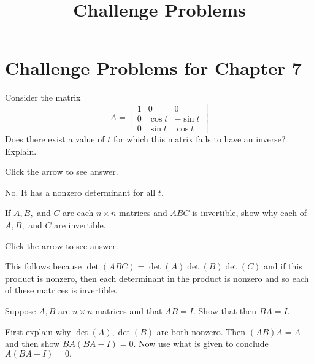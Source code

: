 \documentclass{ximera}
\title{Challenge Problems} \license{CC BY-NC-SA 4.0}
\begin{document}
\begin{abstract}
\end{abstract}
\maketitle

\section*{Challenge Problems for Chapter 7}

\begin{problem}\label{prb:7.32} Consider the matrix
\begin{equation*}
A =
\left[
\begin{array}{ccc}
1 & 0 & 0 \\
0 & \cos t & -\sin t \\
0 & \sin t & \cos t
\end{array}
\right]
\end{equation*}
Does there exist a value of $t$ for which this matrix fails to have an
inverse? Explain.

Click the arrow to see answer.
\begin{expandable}
 No. It has a nonzero determinant for all $t$.
\end{expandable}
\end{problem}

\begin{problem}\label{prb:7.41} If $A,B,$ and $C$ are each $n\times n$ matrices and $ABC$ is
invertible, show why each of $A,B,$ and $C$ are invertible.

Click the arrow to see answer.

\begin{expandable}
This follows
because $\det \left( ABC\right) =\det \left( A\right) \det \left( B\right)
\det \left( C\right) $ and if this product is nonzero, then each determinant
in the product is nonzero and so each of these matrices is invertible.
\end{expandable}
\end{problem}

\begin{problem}\label{prb:7.37} Suppose $A,B$ are $n\times n$ matrices and that $AB=I.$ Show that then
$BA=I.$ 
\begin{hint}
First explain why
$\det \left( A\right) ,\det \left( B\right) $ are both nonzero. Then $\left(
AB\right) A=A$ and then show $BA\left( BA-I\right) =0.$ Now use what
is given to conclude $A\left( BA-I\right) =0.$ 
\end{hint}
\end{problem}
\end{document}

